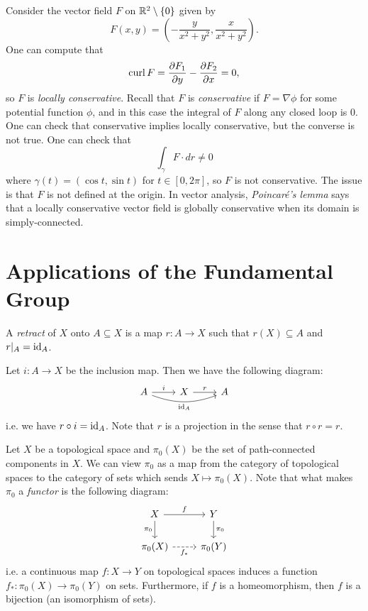 \begin{example}
  Consider the vector field $F$ on
  $\mathbb{R}^2 \setminus \{0\}$ given by
  \[
    F(x, y) =
    \left(-\frac{y}{x^2 + y^2}, \frac{x}{x^2 + y^2}\right).
  \]
  One can compute that
  \[
    \operatorname{curl} F = \frac{\partial F_1}{\partial y} - \frac{\partial F_2}{\partial x} = 0,
  \]
  so $F$ is \emph{locally conservative}. Recall that
  $F$ is \emph{conservative} if $F = \nabla \phi$
  for some potential function $\phi$, and in this
  case the integral of $F$ along any closed loop is
  $0$. One can check
  that conservative implies locally conservative,
  but the converse is not true. One can check that
  \[
    \int_{\gamma} F \cdot dr \ne 0
  \]
  where $\gamma(t) = (\cos t, \sin t)$ for
  $t \in [0, 2\pi]$, so $F$ is not conservative.
  The issue is that $F$ is not defined at the origin.
  In vector analysis, \emph{Poincar\'e's lemma}
  says that a locally conservative vector field is
  globally conservative when its domain
  is simply-connected.
\end{example}

\section{Applications of the Fundamental Group}
\begin{definition}
  A \emph{retract} of $X$ onto $A \subseteq X$ is a
  map $r : A \to X$ such that $r(X) \subseteq A$
  and $r|_A = \operatorname{id}_A$.
\end{definition}

\begin{remark}
  Let $i : A \to X$ be the inclusion map. Then
  we have the following diagram:
  \[
    \begin{tikzcd}
      A \ar[r, "i"] \ar[rr, bend right=20, "\id_A", swap]& X \ar[r, "r"] & A
    \end{tikzcd}
  \]
  i.e. we have $r \circ i = \operatorname{id}_A$. Note
  that $r$ is a projection in the sense that
  $r \circ r = r$.
\end{remark}

\begin{example}[Functoriality]
  Let $X$ be a topological space and
  $\pi_0(X)$ be the set of path-connected
  components in $X$. We can view $\pi_0$ as a
  map from the category of topological spaces to
  the category of sets which sends
  $X \mapsto \pi_0(X)$. Note that what makes
  $\pi_0$ a \emph{functor} is the following
  diagram:
  \[
    \begin{tikzcd}
      X \ar[r, "f"] \ar[d, "\pi_0"'] & Y \ar[d, "\pi_0"] \\
      \pi_0(X) \ar[r, "f_*"', dashed] & \pi_0(Y)
    \end{tikzcd}
  \]
  i.e. a continuous map $f : X \to Y$ on topological
  spaces
  induces a function $f_* : \pi_0(X) \to \pi_0(Y)$
  on sets. Furthermore, if $f$ is a homeomorphism,
  then $f$ is a bijection (an isomorphism of sets).
\end{example}

